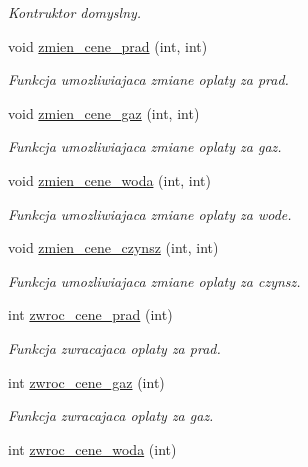 \begin{DoxyCompactItemize}
\begin{DoxyCompactList}\small\item\em Kontruktor domyslny. \end{DoxyCompactList}\item 
void \hyperlink{class_obsluga__podatkow_a1eb458cd5aa37d5da43669465e082785}{zmien\+\_\+cene\+\_\+prad} (int, int)
\begin{DoxyCompactList}\small\item\em Funkcja umozliwiajaca zmiane oplaty za prad. \end{DoxyCompactList}\item 
void \hyperlink{class_obsluga__podatkow_a990892e62f388065b1b3de92456af182}{zmien\+\_\+cene\+\_\+gaz} (int, int)
\begin{DoxyCompactList}\small\item\em Funkcja umozliwiajaca zmiane oplaty za gaz. \end{DoxyCompactList}\item 
void \hyperlink{class_obsluga__podatkow_a4ba15afdd73eb4320208426666964a33}{zmien\+\_\+cene\+\_\+woda} (int, int)
\begin{DoxyCompactList}\small\item\em Funkcja umozliwiajaca zmiane oplaty za wode. \end{DoxyCompactList}\item 
void \hyperlink{class_obsluga__podatkow_a15a42e2796b0e854cdc45fecd7fd25ec}{zmien\+\_\+cene\+\_\+czynsz} (int, int)
\begin{DoxyCompactList}\small\item\em Funkcja umozliwiajaca zmiane oplaty za czynsz. \end{DoxyCompactList}\item 
int \hyperlink{class_obsluga__podatkow_a4dffa344e102b4c31943eb4cd0d8e717}{zwroc\+\_\+cene\+\_\+prad} (int)
\begin{DoxyCompactList}\small\item\em Funkcja zwracajaca oplaty za prad. \end{DoxyCompactList}\item 
int \hyperlink{class_obsluga__podatkow_ab800b960d0092dfb382f516907a36d57}{zwroc\+\_\+cene\+\_\+gaz} (int)
\begin{DoxyCompactList}\small\item\em Funkcja zwracajaca oplaty za gaz. \end{DoxyCompactList}\item 
int \hyperlink{class_obsluga__podatkow_a873587df8807a3964724b825c2a60272}{zwroc\+\_\+cene\+\_\+woda} (int)

\end{DoxyCompactItemize}

